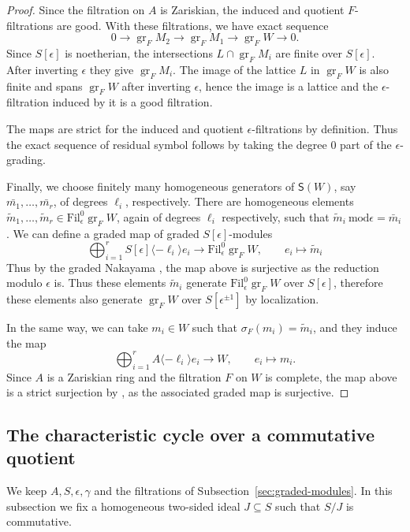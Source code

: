 \documentclass[11pt]{article}
\theoremstyle{definition}
\newcommand{\gr}{\operatorname{gr}}
\begin{document}
\begin{proof}
Since the filtration on $A$ is Zariskian, the induced and quotient
$F$-filtrations are good. With these filtrations, we have exact sequence
\[
 0\longrightarrow\gr_FM_2\longrightarrow\gr_FM_1
 \longrightarrow\gr_FW\longrightarrow0.
\]
Since $S[\epsilon]$ is noetherian, the intersections
$L\cap\gr_FM_i$ are finite over $S[\epsilon]$. After inverting $\epsilon$ they give
$\gr_FM_i$. The image of the lattice $L$ in $\gr_FW$ is also finite and
spans $\gr_FW$ after inverting $\epsilon$, hence the image is a lattice and the $\epsilon$-filtration 
induced by it is a good filtration.

The maps are strict for the induced and quotient
$\epsilon$-filtrations by definition.
Thus the exact sequence of residual symbol 
follows by taking the degree $0$ part of the $\epsilon$-grading.

Finally, we choose finitely many homogeneous generators of $\mathsf{S}(W)$, say $\bar{m_1}, \dots, \bar{m_r}$, of degrees $\ell_i$, respectively. 
There are homogeneous elements $\tilde{m}_1, \dots, \tilde{m}_r\in\mathrm{Fil}_{\epsilon}^0\gr_FW$, again of degrees $\ell_i$ respectively, such that $\tilde{m}_i\ \mathrm{mod}\epsilon=\bar{m}_i$.
We can define a graded map of graded $S[\epsilon]$-modules \[\bigoplus_{i=1}^r S[\epsilon]\langle-\ell_i\rangle e_i\to\mathrm{Fil}_{\epsilon}^0\gr_FW, \qquad e_i\mapsto\tilde{m}_i\]
Thus by the graded Nakayama \cite[Lemma~6.2]{NegronPevtsova2023}, the map above is surjective as the reduction modulo $\epsilon$ is. Thus these elements $\tilde{m}_i$ generate $\mathrm{Fil}_{\epsilon}^0\gr_FW$ over $S[\epsilon]$, 
therefore these elements also generate $\gr_FW$ over $S[\epsilon^{\pm1}]$ by localization. 

In the same way, we can take $m_i\in W$ such that $\sigma_F(m_i)=\tilde{m}_i$, and they induce the map
\[\bigoplus_{i=1}^rA\langle-\ell_i\rangle e_i\to W, \qquad e_i\mapsto m_i.\]
Since $A$ is a Zariskian ring and the filtration $F$ on $W$ is complete, the map above is a strict surjection by \cite[Theorem~I.4.2.4.(5)]{LvO96}, as the associated graded map is surjective.
\end{proof}

\subsection{The characteristic cycle over a commutative quotient}
\label{sec:uniform}
We keep $A,S,\epsilon,\gamma$ and the filtrations of
Subsection~\ref{sec:graded-modules}. In this subsection we fix a homogeneous two-sided ideal
$J\subseteq S$ such that $S/J$ is commutative.
\end{document}
